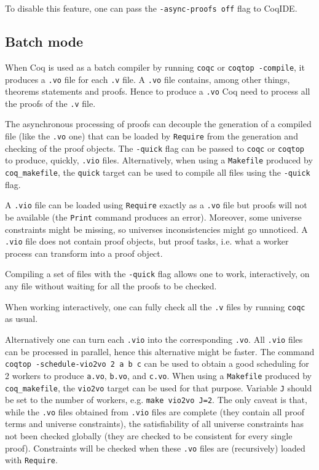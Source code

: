 To disable this feature, one can pass the \texttt{-async-proofs off} flag to
CoqIDE.

\subsection{Batch mode}

When Coq is used as a batch compiler by running \texttt{coqc} or
\texttt{coqtop -compile}, it produces a \texttt{.vo} file for each
\texttt{.v} file. A \texttt{.vo} file contains, among other things,
theorems statements and proofs. Hence to produce a \texttt{.vo} Coq need
to process all the proofs of the \texttt{.v} file.

The asynchronous processing of proofs can decouple the generation of a
compiled file (like the \texttt{.vo} one) that can be loaded by
\texttt{Require} from the generation and checking of the proof objects.
The \texttt{-quick} flag can be passed to \texttt{coqc} or
\texttt{coqtop} to produce, quickly, \texttt{.vio} files. Alternatively,
when using a \texttt{Makefile} produced by \texttt{coq\_makefile}, the
\texttt{quick} target can be used to compile all files using the
\texttt{-quick} flag.

A \texttt{.vio} file can be loaded using \texttt{Require} exactly as a
\texttt{.vo} file but proofs will not be available (the \texttt{Print}
command produces an error). Moreover, some universe constraints might be
missing, so universes inconsistencies might go unnoticed. A
\texttt{.vio} file does not contain proof objects, but proof tasks,
i.e. what a worker process can transform into a proof object.

Compiling a set of files with the \texttt{-quick} flag allows one to work,
interactively, on any file without waiting for all the proofs to be checked.

When working interactively, one can fully check all the \texttt{.v} files by
running \texttt{coqc} as usual.

Alternatively one can turn each \texttt{.vio} into the corresponding
\texttt{.vo}.  All \texttt{.vio} files can be processed in parallel,
hence this alternative might be faster. The command \texttt{coqtop
 -schedule-vio2vo 2 a b c} can be used to obtain a good scheduling for 2
workers to produce \texttt{a.vo}, \texttt{b.vo}, and \texttt{c.vo}. When
using a \texttt{Makefile} produced by \texttt{coq\_makefile}, the
\texttt{vio2vo} target can be used for that purpose.  Variable \texttt{J}
should be set to the number of workers, e.g. \texttt{make vio2vo J=2}.
The only caveat is that, while the \texttt{.vo} files obtained from
\texttt{.vio} files are complete (they contain all proof terms and
universe constraints), the satisfiability of all universe constraints has
not been checked globally (they are checked to be consistent for every
single proof). Constraints will be checked when these \texttt{.vo} files
are (recursively) loaded with \texttt{Require}.

